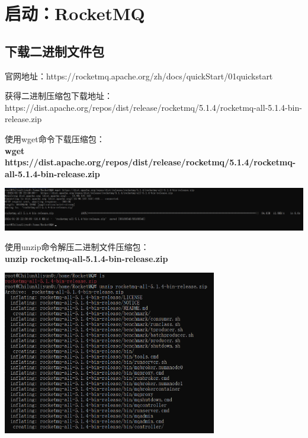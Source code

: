 \documentclass[11pt, a4paper, oneside]{ctexbook}
\let\kaishu\relax                               %
\begin{document}
\chapter{启动：RocketMQ}
\section{下载二进制文件包}
官网地址：https://rocketmq.apache.org/zh/docs/quickStart/01quickstart

获得二进制压缩包下载地址：\\https://dist.apache.org/repos/dist/release/rocketmq/5.1.4/rocketmq-all-5.1.4-bin-release.zip

使用wget命令下载压缩包：\\{\bfseries\kaishu wget https://dist.apache.org/repos/dist/release/rocketmq/5.1.4/rocketmq-all-5.1.4-bin-release.zip}
\begin{center}
  \begin{minipage}{\textwidth}
    \center
    \includegraphics[width=\textwidth]{picture/下载二进制文件.png}
    \captionsetup{hypcap=false}
    \label{fig:下载二进制压缩包}
  \end{minipage}
\end{center}

使用unzip命令解压二进制文件压缩包：\\{\bfseries\kaishu unzip rocketmq-all-5.1.4-bin-release.zip}
\begin{center}
  \begin{minipage}{\textwidth}
    \center
    \includegraphics[width=0.7\textwidth]{picture/解压二进制文件.png}
    \captionsetup{hypcap=false}
    \label{fig:解压二进制文件}
  \end{minipage}
\end{center}
\end{document}
